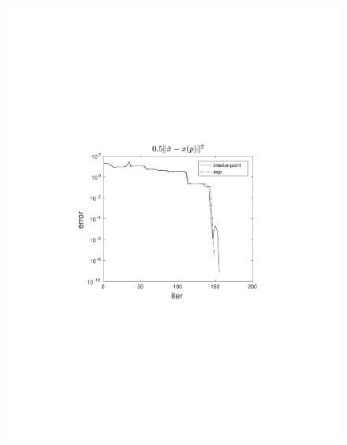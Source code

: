 \documentclass{beamer}
\begin{document}
\begin{frame}
\begin{columns}[t]
\begin{figure}
                \includegraphics[trim=4cm 9cm 4cm 8.5cm, clip=true, width=\linewidth]{img/convPlotX_ref2}
            \end{figure}
    \end{columns}
\end{frame}
\end{document}
